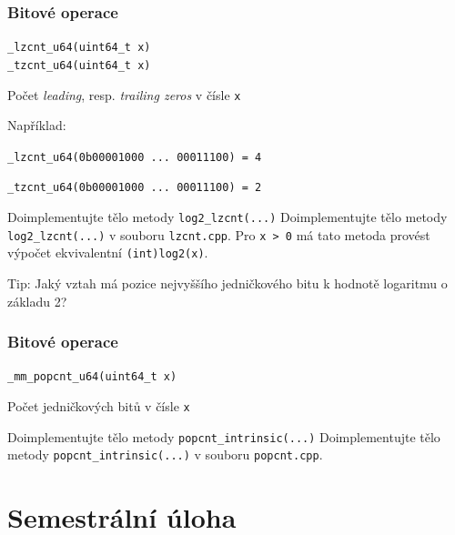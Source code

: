 \documentclass[usenames,dvipsnames,9pt]{beamer}
\begin{document}
{
\begin{frame}
  \frametitle{Bitové operace}

  \texttt{_lzcnt_u64(uint64_t x)} \\
  \texttt{_tzcnt_u64(uint64_t x)}

  \vspace{-0.35em}\hspace{10pt} Počet \emph{leading}, resp. \emph{trailing zeros} v čísle \texttt{x}

  \vspace{1em}

  Například:

  \hspace{10pt} \texttt{_lzcnt_u64(0b00001000 ... 00011100) = 4}

  \hspace{10pt} \texttt{_tzcnt_u64(0b00001000 ... 00011100) = 2}

  \vspace{1em}
  \pause

  \begin{block}{Doimplementujte tělo metody \texttt{log2\_lzcnt(...)}}
    Doimplementujte tělo metody \texttt{log2\_lzcnt(...)} v souboru \texttt{lzcnt.cpp}.
    Pro \texttt{x > 0} má tato metoda provést výpočet ekvivalentní \texttt{(int)log2(x)}.

    Tip: Jaký vztah má pozice nejvyššího jedničkového bitu k hodnotě logaritmu o základu 2?
  \end{block}
\end{frame}
}

{
\begin{frame}
  \frametitle{Bitové operace}

  \texttt{_mm_popcnt_u64(uint64_t x)}

  \vspace{-0.35em}\hspace{10pt} Počet jedničkových bitů v čísle \texttt{x}
  
  \begin{block}{Doimplementujte tělo metody \texttt{popcnt\_intrinsic(...)}}
    Doimplementujte tělo metody \texttt{popcnt\_intrinsic(...)} v souboru \texttt{popcnt.cpp}.
  \end{block}
\end{frame}
}

\section{Semestrální úloha}
\end{document}

